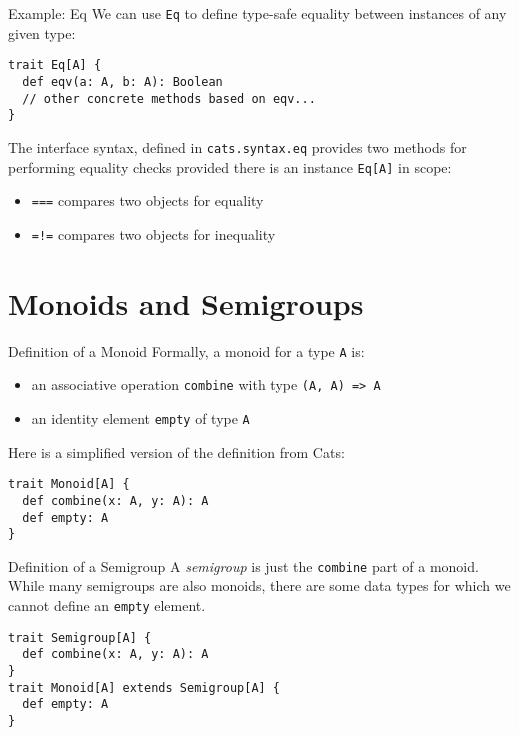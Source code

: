 \documentclass[aspectratio=169]{beamer}
\begin{document}
\begin{frame}[fragile]{Example: Eq}
We can use \texttt{Eq} to define type-safe equality between instances of any given type:
\begin{verbatim}
trait Eq[A] {
  def eqv(a: A, b: A): Boolean
  // other concrete methods based on eqv...
}
\end{verbatim}
The interface syntax, defined in \texttt{cats.syntax.eq} provides two methods for performing equality checks
provided there is an instance \texttt{Eq[A]} in scope:
\begin{itemize}
  \item \texttt{===} compares two objects for equality
  \item \texttt{=!=} compares two objects for inequality
\end{itemize}
\end{frame}

\section{Monoids and Semigroups}

\begin{frame}[fragile]{Definition of a Monoid}
Formally, a monoid for a type \texttt{A} is:
\begin{itemize}
  \item an associative operation \texttt{combine} with type \texttt{(A, A) => A}
  \item an identity element \texttt{empty} of type \texttt{A}
\end{itemize}
\bigskip
Here is a simplified version of the definition from Cats:
\begin{verbatim}
trait Monoid[A] {
  def combine(x: A, y: A): A
  def empty: A
}
\end{verbatim}
\end{frame}

\begin{frame}[fragile]{Definition of a Semigroup}
A \textit{semigroup} is just the \texttt{combine} part of a monoid. While many semigroups are also monoids, there are
some data types for which we cannot define an \texttt{empty} element.
\bigskip
\begin{verbatim}
trait Semigroup[A] {
  def combine(x: A, y: A): A
}
trait Monoid[A] extends Semigroup[A] {
  def empty: A
}
\end{verbatim}
\end{frame}
\end{document}
